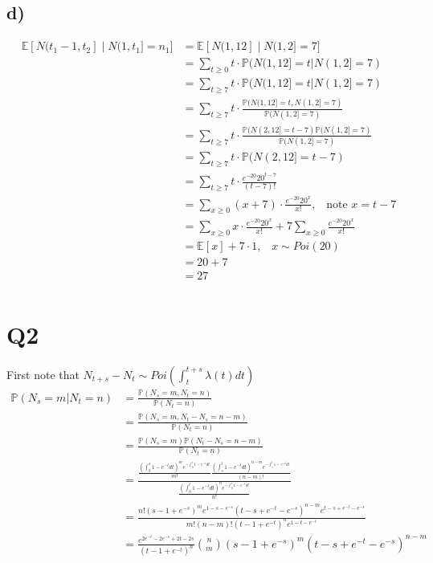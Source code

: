 \documentclass{article}
\begin{document}
\subsection*{d)}
\begin{align*}
\mathbb{E}[N(t_1-1,t_2]\;|\;N(1,t_1]=n_1]&=\mathbb{E}[N(1,12]\;|\;N(1,2]=7]\\
&=\sum_{t\geq0}t\cdot\mathbb{P}(N(1,12]=t|N(1,2]=7)\\
&=\sum_{t\geq7}t\cdot\mathbb{P}(N(1,12]=t|N(1,2]=7)\\
&=\sum_{t\geq7}t\cdot\frac{\mathbb{P}(N(1,12]=t,N(1,2]=7)}{\mathbb{P}(N(1,2]=7)}\\
&=\sum_{t\geq7}t\cdot\frac{\mathbb{P}(N(2,12]=t-7)\mathbb{P}(N(1,2]=7)}{\mathbb{P}(N(1,2]=7)}\\
&=\sum_{t\geq7}t\cdot\mathbb{P}(N(2,12]=t-7)\\
&=\sum_{t\geq7}t\cdot\frac{e^{-20}20^{t-7}}{(t-7)!}\\
&=\sum_{x\geq0}(x+7)\cdot\frac{e^{-20}20^{x}}{x!},\;\;\;\text{note }x=t-7\\
&=\sum_{x\geq0}x\cdot\frac{e^{-20}20^{x}}{x!}+7\sum_{x\geq0}\frac{e^{-20}20^{x}}{x!}\\
&=\mathbb{E}[x]+7\cdot1,\;\;\;x\sim Poi(20)\\
&=20+7\\
&=27\\
\end{align*}
\section*{Q2}
First note that $N_{t+s}-N_{t}\sim Poi\left(\int_{t}^{t+s}\lambda(t)dt\right)$
\begin{align*}
\mathbb{P}(N_{s}=m|N_{t}=n)&=\frac{\mathbb{P}(N_{s}=m,N_{t}=n)}{\mathbb{P}(N_{t}=n)}\\
&=\frac{\mathbb{P}(N_{s}=m,N_{t}-N_{s}=n-m)}{\mathbb{P}(N_{t}=n)}\\
&=\frac{\mathbb{P}(N_{s}=m)\mathbb{P}(N_{t}-N_{s}=n-m)}{\mathbb{P}(N_{t}=n)}\\
&=\frac{\frac{\left(\int_{0}^{s}1-e^{-t}dt\right)^me^{-\int_{0}^{s}1-e^{-t}dt}}{m!}\frac{\left(\int_{s}^{t}1-e^{-t}dt\right)^{n-m}e^{-\int_{s}^{t}1-e^{-t}dt}}{(n-m)!}}{\frac{\left(\int_{0}^{t}1-e^{-t}dt\right)^ne^{-\int_{0}^{t}1-e^{-t}dt}}{n!}}\\
&=\frac{n!(s-1+e^{-s})^me^{1-s-e^{-s}}(t-s+e^{-t}-e^{-s})^{n-m}e^{t-s+e^{-t}-e^{-s}}}{m!(n-m)!(t-1+e^{-t})^ne^{1-t-e^{-t}}}\\
&=\frac{e^{2e^{-t}-2e^{-s}+2t-2s}}{(t-1+e^{-t})^n}{n\choose m}(s-1+e^{-s})^m(t-s+e^{-t}-e^{-s})^{n-m}\\
\end{align*}
\end{document}
